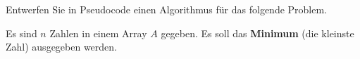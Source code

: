 %
%
Entwerfen Sie in Pseudocode einen Algorithmus für das folgende Problem.

\begin{problem}\label{problem-minimum-n-zahlen}
Es sind $n$ Zahlen in einem Array $A$ gegeben. Es soll das \textbf{Minimum} (die kleinste Zahl) ausgegeben werden.
\end{problem}

